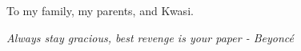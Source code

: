 %
\begin{frontmatter}

%
%
\makefrontmatter

%
%
%
%
%
%
\begin{dedication}
  To my family, my parents, and Kwasi.
\end{dedication}


%
%



%
%
\begin{epigraph} %
  \emph{Always stay gracious, best revenge is your paper - Beyonc\'e}
\end{epigraph}

%


%
\tableofcontents





\end{frontmatter}
